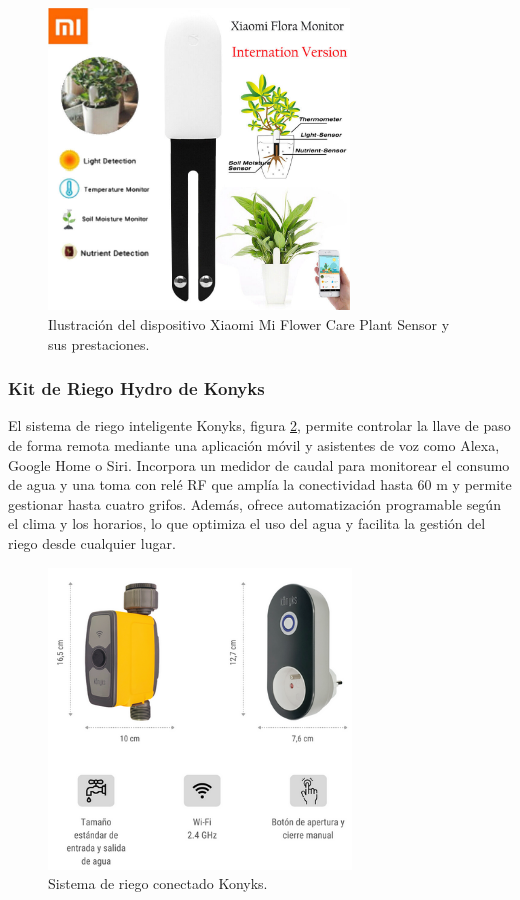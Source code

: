 \begin{figure}[h]
	\centering
	\includegraphics[height=8cm]{./Figures/xiaomi.jpg}
	\caption{Ilustración del dispositivo Xiaomi Mi Flower Care Plant Sensor y sus prestaciones.}
	\label{fig:xiaomi}
\end{figure}


\subsubsection{Kit de Riego Hydro de Konyks}
El sistema de riego inteligente Konyks, figura \ref{fig:kit_konyks}, permite controlar la llave de paso de forma remota mediante una aplicación móvil y asistentes de voz como Alexa, Google Home o Siri. Incorpora un medidor de caudal para monitorear el consumo de agua y una toma con relé RF que amplía la conectividad hasta 60 m y permite gestionar hasta cuatro grifos. Además, ofrece automatización programable según el clima y los horarios, lo que optimiza el uso del agua y facilita la gestión del riego desde cualquier lugar.

\begin{figure}[h]
	\centering
	\includegraphics[height=8cm]{./Figures/kit_konyks.png}
	\caption{Sistema de riego conectado Konyks.}
	\label{fig:kit_konyks}
\end{figure}

